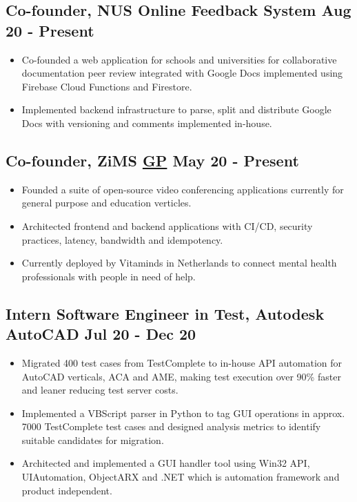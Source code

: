 \documentclass[12pts]{article}
\begin{document}
\subsection*{Co-founder, NUS Online Feedback System \href{https://youtu.be/LVmKodrE8e0}{\faYoutube} \hfill Aug 20 - Present}
\begin{itemize}
    \item Co-founded a web application for schools and universities for collaborative documentation peer review integrated with Google Docs implemented using Firebase Cloud Functions and Firestore.
    \item Implemented backend infrastructure to parse, split and distribute Google Docs with versioning and comments implemented in-house.
\end{itemize}

\subsection*{Co-founder, ZiMS \href{https://github.com/zims-live}{\faGithub GP} \hfill May 20 - Present}
\begin{itemize}
    \item Founded a suite of open-source video conferencing applications currently for general purpose and education verticles.
    \item Architected frontend and backend applications with CI/CD, security practices, latency, bandwidth and idempotency.
    \item Currently deployed by Vitaminds in Netherlands to connect mental health professionals with people in need of help.
\end{itemize}

\subsection*{Intern Software Engineer in Test, Autodesk AutoCAD \hfill Jul 20 - Dec 20}
\begin{itemize}
    \item Migrated 400 test cases from TestComplete to in-house API automation for AutoCAD verticals, ACA and AME, making test execution over 90\% faster and leaner reducing test server costs.
    \item Implemented a VBScript parser in Python to tag GUI operations in approx. 7000 TestComplete test cases and designed analysis metrics to identify suitable candidates for migration.
    \item Architected and implemented a GUI handler tool using Win32 API, UIAutomation, ObjectARX and .NET which is automation framework and product independent.
\end{itemize}
\end{document}

